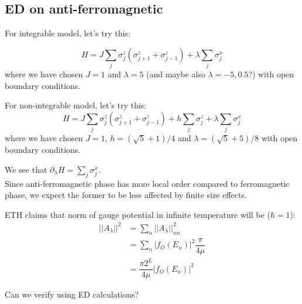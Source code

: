 \documentclass[11pt,a4paper]{article}
\begin{document}
\subsection{ED on anti-ferromagnetic}
For integrable model, let's try this:

\begin{equation}
H= J \sum_{j} \sigma_j^z(\sigma_{j+1}^z+ \sigma_{j-1}^z) + \lambda \sum_{j} \sigma_j^x
\end{equation}
where we have chosen $J=1$ and $\lambda=5$ (and maybe also $\lambda=-5, 0.5$?) with open boundary conditions.

For non-integrable model, let's try this:
\begin{equation}
H= J \sum_{j} \sigma_j^z (\sigma_{j+1}^z+ \sigma_{j-1}^z) + h\sum_{j} \sigma_j^z +\lambda \sum_{j} \sigma_j^x 
\end{equation}
where we have chosen $J=1$, $h= (\sqrt{5}+1)/4$ and $\lambda=(\sqrt{5}+5)/8$ with open boundary conditions.

We see that $\partial_{\lambda}H =  \sum_{j} \sigma_j^x  $. \\
Since anti-ferromagnetic phase has more local order compared to ferromagnetic phase, we expect the former to be less affected by finite size effects.


ETH claims that norm of gauge potential in infinite temperature will be ($\hbar=1$):
\begin{align*}
||A_{\lambda}||^2 &= \sum_n ||A_{\lambda}||^2_{nn} \\
&= \sum_n |f_O(E_n)|^2\dfrac{\pi}{4 \mu}\\
&= \dfrac{\pi 2^L}{4 \mu} |f_O(E_n)|^2 
\end{align*}

Can we verify using ED calculations?
\appendix



 


%
\end{document}
